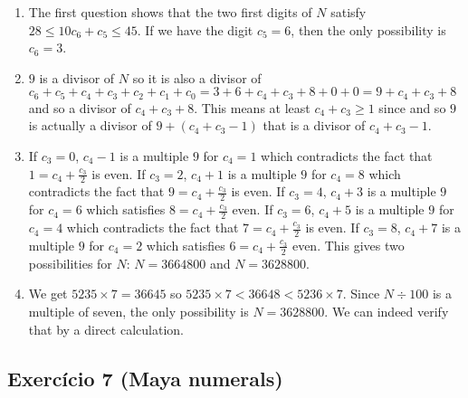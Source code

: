 \begin{enumerate}
\item
  The first question shows that the two first digits of $N$ satisfy
  $28 \leq {10c_6 + c_5} \leq 45$. If we have the digit $c_5=6$, then
  the only possibility is $c_6=3$.

\item
  $9$ is a divisor of $N$ so
  it is also a divisor of
  $c_6+c_5+c_4+c_3+c_2+c_1+c_0 = 3+6+c_4+c_3+8+0+0 = 9 + c_4+c_3+8$
  and so a divisor of $c_4+c_3+8$. This means at least $c_4+c_3 \geq 1$ since
  and so $9$ is actually a divisor of $9 + (c_4+c_3-1)$ that is a divisor
  of $c_4+c_3-1$.

\item If $c_3=0$, $c_4-1$ is a multiple $9$ for $c_4=1$ which contradicts the
  fact that $1=c_4 + \frac{c_3}{2}$ is even.
  If $c_3=2$, $c_4+1$ is a multiple $9$ for $c_4=8$ which contradicts the fact
  that $9=c_4 + \frac{c_3}{2}$ is even.
  If $c_3=4$, $c_4+3$ is a multiple $9$ for $c_4=6$ which satisfies
  $8=c_4 + \frac{c_3}{2}$ even.
  If $c_3=6$, $c_4+5$ is a multiple $9$ for $c_4=4$ which contradicts the fact
  that $7=c_4 + \frac{c_3}{2}$ is even.
  If $c_3=8$, $c_4+7$ is a multiple $9$ for $c_4=2$ which satisfies
  $6=c_4 + \frac{c_3}{2}$ even.
  This gives two possibilities for $N$:
  $N = 3664800$ and $N=3628800$.

\item We get $5235 \times 7 = 36645$ so
  $5235 \times 7 < 36648 < 5236 \times 7$. Since $N \div 100$ is a multiple
  of seven, the only possibility is $N=3628800$. We can indeed verify
  that by a direct calculation.
\end{enumerate}

\subsection*{Exercício 7 (Maya numerals)}

